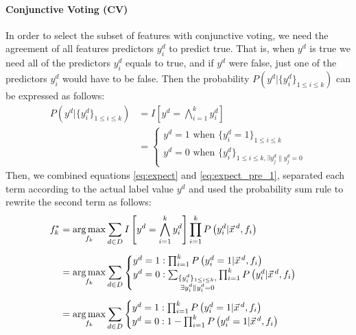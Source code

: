\paragraph{Conjunctive Voting (CV)}
In order to select the subset of features with conjunctive voting, 
we need the agreement of all features predictors
$y^d_i$ to predict true. That is, when $y^d$ is true we need all of
the predictors $y^d_i$ equals to true, and if $y^d$ were false, just
one of the predictors $y^d_i$ would have to be false. Then the
probability $P\left(y^d|\{y^d_i\}_{1\leq i\leq k}\right)$ can be
expressed as follows:
{\small 
\begin{align}
P\left(y^d|\{y^d_i\}_{1\leq i\leq k}\right) & =I\left[y^d=\bigwedge_{i=1}^k y^d_i\right] \nonumber\\
&= \begin{cases}
	y^d=1 \text{ when } \{y_i^d=1\}_{1\leq i\leq k}\\
	y^d=0 \text{ when } \{y_i^d\}_{1\leq i\leq k,\exists{y_j^d\|y_j^d=0}}
\end{cases}\label{eq:expect_pre_1}
\end{align}}
Then, we combined equations \eqref{eq:expect} and
\eqref{eq:expect_pre_1}, separated each term according to the actual
label value $y^d$ and used the probability sum rule to rewrite the
second term as follows:
\begin{align}
f_k^*&=\argmax_{f_k}\sum_{d\in D}I\left[y^d=\bigwedge_{i=1}^k y^d_i\right]\prod_{i=1}^kP\left(y_i^d|\vec{x}^{\,d},f_i\right)\nonumber\\[0.5em]
&=\argmax_{f_k}\sum_{d\in D}
\begin{cases}
	y^d=1: \prod_{i=1}^kP\left(y_i^d=1|\vec{x}^{\,d},f_i\right)\\
	y^d=0: \sum_{\substack{\{y_i^d\}_{1\leq i\leq k},\\ \exists{y_i^d\|y_i^d=0}}}\prod_{i=1}^kP\left(y_i^d|\vec{x}^{\,d},f_i\right)
\end{cases}\nonumber\\[0.5em]
&=\argmax_{f_k}\sum_{d\in D}
\begin{cases}
	y^d=1: \prod_{i=1}^kP\left(y_i^d = 1|\vec{x}^{\,d},f_i\right)\\
	y^d=0: 1-\prod_{i=1}^kP\left(y_i^d = 1|\vec{x}^{\,d},f_i\right)
\end{cases}\label{eq:expect_pre_2}%
\end{align}
